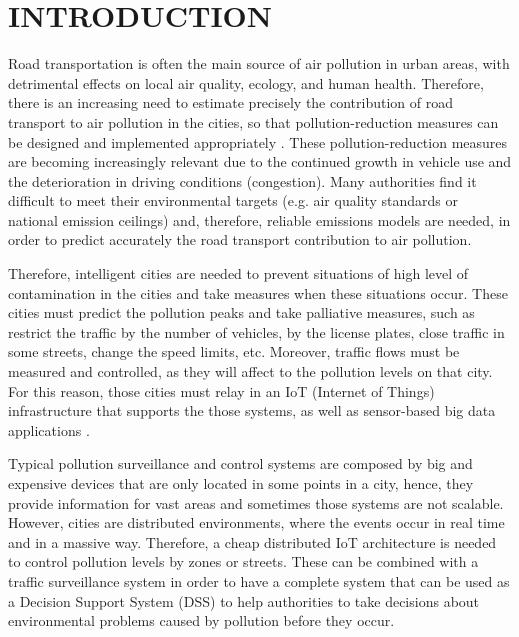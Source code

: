 \documentclass{pre-tfg}
\title{\REDNOTE{An integrated IoT approach for monitoring road traffic and air pollution in urban areas}}%
\author{José Ángel Martín Baos}
\begin{document}
\maketitle
\tableofcontents

\newpage


\section{INTRODUCTION} %

Road transportation is often the main source of air pollution in urban areas, with detrimental effects on local air quality, ecology, and human health. Therefore, there is an increasing need to estimate precisely the contribution of road transport to air pollution in the cities, so that pollution-reduction measures can be designed and implemented appropriately \cite{SNB10}. These pollution-reduction measures are becoming increasingly relevant due to the continued growth in vehicle use and the deterioration in driving conditions (congestion). Many authorities find it difficult to meet their environmental targets (e.g. air quality standards or national emission ceilings) and, therefore, reliable emissions models are needed, in order to predict accurately the road transport contribution to air pollution.

Therefore, intelligent cities are needed to prevent situations of high level of contamination in the cities and take measures when these situations occur. These cities must predict the pollution peaks and take palliative measures, such as restrict the traffic by the number of vehicles, by the license plates, close traffic in some streets, change the speed limits, etc. Moreover, traffic flows must be measured and controlled, as they will affect to the pollution levels on that city. For this reason, those cities must relay in an IoT (Internet of Things) infrastructure that supports the those systems, as well as sensor-based big data applications \cite{Bib18}.



Typical pollution surveillance and control systems are composed by big and expensive devices that are only located in some points in a city, hence, they provide information for vast areas and sometimes those systems are not scalable. However, cities are distributed environments, where the events occur in real time and in a massive way. Therefore, a cheap distributed IoT architecture is needed to control pollution levels by zones or streets. These can be combined with a traffic surveillance system in order to have a complete system that can be used as a Decision Support System (DSS) to help authorities to take decisions about environmental problems caused by pollution before they occur.
\end{document}
